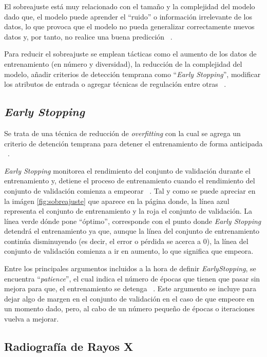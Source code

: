 El sobreajuste está muy relacionado con el tamaño y la complejidad del modelo dado que, el modelo puede aprender el ``ruido'' o información irrelevante de los datos, lo que provoca que el modelo no pueda generalizar correctamente nuevos datos y, por tanto, no realice una buena predicción ~\cite{ibm24}.

Para reducir el sobreajuste se emplean tácticas como el aumento de los datos de entrenamiento (en número y diversidad), la reducción de la complejidad del modelo, añadir criterios de detección temprana como ``\textit{Early Stopping}'', modificar los atributos de entrada o agregar técnicas de regulación entre otras ~\cite{diego23}. 

\subsection{\textit{Early Stopping}}
Se trata de una técnica de reducción de \textit{overfitting} con la cual se agrega un criterio de detención temprana para detener el entrenamiento de forma anticipada ~\cite{diego23}.

\textit{Early Stopping} monitorea el rendimiento del conjunto de validación durante el entrenamiento y, detiene el proceso de entrenamiento cuando el rendimiento del conjunto de validación comienza a empeorar ~\cite{keras24}. Tal y como se puede apreciar en la imágen \ref{fig:sobreajuste} que aparece en la página \pageref{fig:sobreajuste} donde, la línea azul representa el conjunto de entrenamiento y la roja el conjunto de validación. La línea verde dónde pone ``óptimo'', corresponde con el punto donde \textit{Early Stopping} detendrá el entrenamiento ya que, aunque la línea del conjunto de entrenamiento continúa disminuyendo (es decir, el error o pérdida se acerca a 0), la línea del conjunto de validación comienza a ir en aumento, lo que significa que empeora.

Entre los principales argumentos incluidos a la hora de definir \textit{EarlyStopping}, se encuentra ``\textit{patience}'', el cual indica el número de épocas que tienen que pasar sin mejora para que, el entrenamiento se detenga ~\cite{keras24}. Este argumento se incluye para dejar algo de margen en el conjunto de validación en el caso de que empeore en un momento dado, pero, al cabo de un número pequeño de épocas o iteraciones vuelva a mejorar. 

\subsection{Radiografía de Rayos X}

